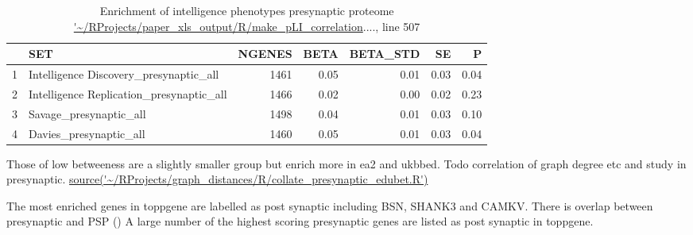 \begin{table}[ht]
\centering
\begin{tabular}{rlrrrrr}
  \hline
 & SET & NGENES & BETA & BETA\_STD & SE & P \\ 
  \hline 

1 & Intelligence Discovery\_presynaptic\_all & 1461 & 0.05 & 0.01 & 0.03 & 0.04 \\ 
  2 & Intelligence Replication\_presynaptic\_all & 1466 & 0.02 & 0.00 & 0.02 & 0.23 \\ 
  3 & Savage\_presynaptic\_all & 1498 & 0.04 & 0.01 & 0.03 & 0.10 \\ 
  4 & Davies\_presynaptic\_all & 1460 & 0.05 & 0.01 & 0.03 & 0.04 \\ 
   \hline
\end{tabular}
\caption{Enrichment of intelligence phenotypes presynaptic proteome \url{'~/RProjects/paper_xls_output/R/make_pLI_correlation}...., line 507} 
\label{Table:Enrichment of intelligence phenotypes presynaptic proteome}
\end{table}

Those of low betweeness are a slightly smaller group but enrich more in ea2 and ukbbed. Todo correlation of graph degree etc and study in presynaptic. \url{source('~/RProjects/graph_distances/R/collate_presynaptic_edubet.R')}
 

The most enriched genes in toppgene are labelled as post synaptic including BSN, SHANK3 and CAMKV. There is overlap between presynaptic and PSP () A large number of the highest scoring presynaptic genes are listed as post synaptic in toppgene. 

